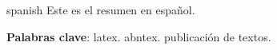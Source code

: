 \begin{resumo}[Resumen]
 \begin{otherlanguage*}{spanish}
   Este es el resumen en español.
  
   \textbf{Palabras clave}: latex. abntex. publicación de textos.
 \end{otherlanguage*}
\end{resumo}
